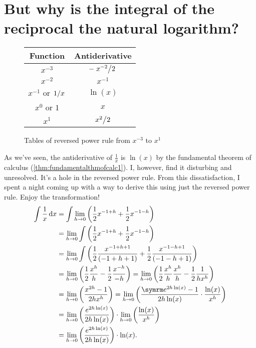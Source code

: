 \section{But why is the integral of the reciprocal the natural logarithm?}
\label{sec:integralofthereciprocal}

\begin{wrapfigure}{r}{0.5\textwidth}
    \centering
    \begin{tabular}{c | c}
        Function & Antiderivative \\
        \hline
        $x^{-3}$ & $-\flatfrac{x^{-2}}{2}$ \\
        $x^{-2}$ & $x^{-1}$ \\
        $x^{-1}$ or $\flatfrac{1}{x}$ & $\ln(x)$ \\
        $x^{0}$ or $1$ & $x$ \\
        $x^1$ & $\flatfrac{x^2}{2}$ \\
    \end{tabular}
    \caption{Tables of reversed power rule from $x^{-3}$ to $x^1$}
\end{wrapfigure}
As we've seen, the antiderivative of $\frac{1}{x}$ is $\ln(x)$ by the fundamental theorem of calculus (\cref{thm:fundamentalthmofcalc1}). I, however, find it disturbing and unresolved. It's a hole in the reversed power rule. From this dissatisfaction, I spent a night coming up with a way to derive this using just the reversed power rule. Enjoy the transformation!
\begin{align}
    \int \frac{1}{x}\dd{x} &= \int\lim_{h \appr 0}\left(\frac{1}{2}x^{-1 + h} + \frac{1}{2}x^{-1 - h}\right) \nonumber\\
    &= \lim_{h \appr 0}\int\left(\frac{1}{2}x^{-1 + h} + \frac{1}{2}x^{-1 - h}\right) \nonumber\\
    &= \lim_{h \appr 0}\int\left(\frac{1}{2}\frac{x^{-1 + h + 1}}{(-1 + h + 1)} + \frac{1}{2}\frac{x^{-1 - h + 1}}{(-1 - h + 1)}\right) \nonumber\\
    &= \lim_{h \appr 0}\left(\frac{1}{2}\frac{x^h}{h} - \frac{1}{2}\frac{x^{-h}}{-h}\right) = \lim_{h \appr 0}\left(\frac{1}{2}\frac{x^h}{h}\frac{x^h}{h} - \frac{1}{2}\frac{1}{hx^h}\right) \nonumber\\
    &= \lim_{h \appr 0}\left(\frac{x^{2h} - 1}{2hx^h}\right) = \lim_{h \appr 0}\left(\frac{\e^{2h\ln(x)} - 1}{2h\ln(x)}\cdot\frac{\ln(x)}{x^h}\right) \nonumber\\
    &= \lim_{h \appr 0}\left(\frac{e^{2h\ln(x)}}{2h\ln(x)}\right) \cdot \lim_{h \appr 0}\left(\frac{\ln(x)}{x^h}\right) \nonumber\\
    &= \lim_{h \appr 0}\left(\frac{e^{2h\ln(x)}}{2h\ln(x)}\right) \cdot \ln(x). \label{eq:logarithmsprove1}
\end{align}
